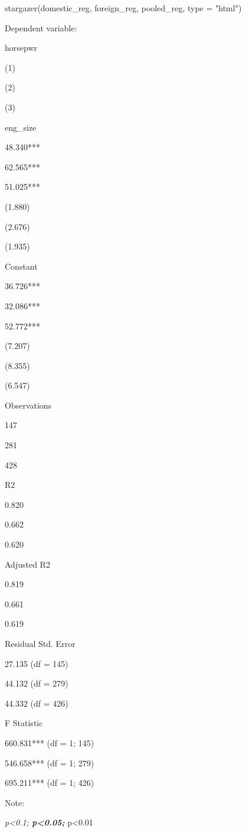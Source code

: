 \documentclass[
  letterpaper,
]{book}
\newenvironment{Shaded}{\begin{snugshade}}{\end{snugshade}}
\newcommand{\AttributeTok}[1]{\textcolor[rgb]{0.40,0.45,0.13}{#1}}
\newcommand{\FunctionTok}[1]{\textcolor[rgb]{0.28,0.35,0.67}{#1}}
\newcommand{\NormalTok}[1]{\textcolor[rgb]{0.00,0.23,0.31}{#1}}
\newcommand{\OtherTok}[1]{\textcolor[rgb]{0.00,0.23,0.31}{#1}}
\newcommand{\SpecialCharTok}[1]{\textcolor[rgb]{0.37,0.37,0.37}{#1}}
\newcommand{\StringTok}[1]{\textcolor[rgb]{0.13,0.47,0.30}{#1}}
\begin{document}
\begin{Shaded}
\begin{Highlighting}[]
\FunctionTok{stargazer}\NormalTok{(domestic\_reg, foreign\_reg, pooled\_reg, }\AttributeTok{type =} \StringTok{"html"}\NormalTok{)}
\end{Highlighting}
\end{Shaded}

Dependent variable:

horsepwr

(1)

(2)

(3)

eng\_size

48.340***

62.565***

51.025***

(1.880)

(2.676)

(1.935)

Constant

36.726***

32.086***

52.772***

(7.207)

(8.355)

(6.547)

Observations

147

281

428

R2

0.820

0.662

0.620

Adjusted R2

0.819

0.661

0.619

Residual Std. Error

27.135 (df = 145)

44.132 (df = 279)

44.332 (df = 426)

F Statistic

660.831*** (df = 1; 145)

546.658*** (df = 1; 279)

695.211*** (df = 1; 426)

Note:

\emph{p\textless0.1; \textbf{p\textless0.05; }}p\textless0.01

\begin{Shaded}
\end{Shaded}
\end{document}
